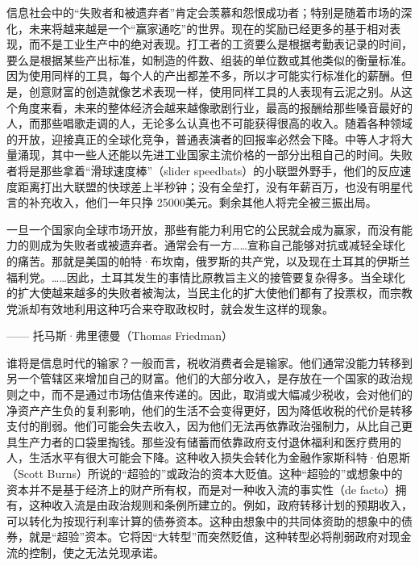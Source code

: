信息社会中的“失败者和被遗弃者”肯定会羡慕和怨恨成功者；特别是随着市场的深化，未来将越来越是一个“赢家通吃”的世界。现在的奖励已经更多的基于相对表现，而不是工业生产中的绝对表现。打工者的工资要么是根据考勤表记录的时间，要么是根据某些产出标准，如制造的件数、组装的单位数或其他类似的衡量标准。因为使用同样的工具，每个人的产出都差不多，所以才可能实行标准化的薪酬。但是，创意财富的创造就像艺术表现一样，使用同样工具的人表现有云泥之别。从这个角度来看，未来的整体经济会越来越像歌剧行业，最高的报酬给那些嗓音最好的人，而那些唱歌走调的人，无论多么认真也不可能获得很高的收入。随着各种领域的开放，迎接真正的全球化竞争，普通表演者的回报率必然会下降。中等人才将大量涌现，其中一些人还能以先进工业国家主流价格的一部分出租自己的时间。失败者将是那些拿着“滑球速度棒”（slider speedbats）的小联盟外野手，他们的反应速度距离打出大联盟的快球差上半秒钟；没有全垒打，没有年薪百万，也没有明星代言的补充收入，他们一年只挣 25000美元。剩余其他人将完全被三振出局。

\begin{tcolorbox}
\kaishu 一旦一个国家向全球市场开放，那些有能力利用它的公民就会成为赢家，而没有能力的则成为失败者或被遗弃者。通常会有一方……宣称自己能够对抗或减轻全球化的痛苦。那就是美国的帕特·布坎南，俄罗斯的共产党，以及现在土耳其的伊斯兰福利党。……因此，土耳其发生的事情比原教旨主义的接管要复杂得多。当全球化的扩大使越来越多的失败者被淘汰，当民主化的扩大使他们都有了投票权，而宗教党派却有效地利用这种巧合来夺取政权时，就会发生这样的现象。
\begin{flushright}
—— 托马斯·弗里德曼（Thomas Friedman） 
\end{flushright}
\end{tcolorbox}

谁将是信息时代的输家？一般而言，税收消费者会是输家。他们通常没能力转移到另一个管辖区来增加自己的财富。他们的大部分收入，是存放在一个国家的政治规则之中，而不是通过市场估值来传递的。因此，取消或大幅减少税收，会对他们的净资产产生负的复利影响，他们的生活不会变得更好，因为降低收税的代价是转移支付的削弱。他们可能会失去收入，因为他们无法再依靠政治强制力，从比自己更具生产力者的口袋里掏钱。那些没有储蓄而依靠政府支付退休福利和医疗费用的人，生活水平有很大可能会下降。这种收入损失会转化为金融作家斯科特·伯恩斯（Scott Burns）所说的“超验的”或政治的资本大贬值。这种“超验的”或想象中的资本并不是基于经济上的财产所有权，而是对一种收入流的事实性（de facto）拥有，这种收入流是由政治规则和条例所建立的。例如，政府转移计划的预期收入，可以转化为按现行利率计算的债券资本。这种由想象中的共同体资助的想象中的债券，就是“超验”资本。它将因“大转型”而突然贬值，这种转型必将削弱政府对现金流的控制，使之无法兑现承诺。

